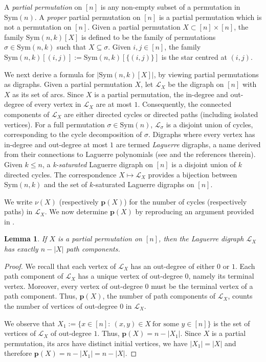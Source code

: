 \documentclass{amsart}
\newtheorem{lem}[thm]{Lemma}
\newcommand{\cy}{\nu}
\newcommand{\mcal}{\mathcal}
\newcommand{\sym}{\mathrm{Sym}}
\begin{document}
A {\it partial permutation} on $[n]$ is any non-empty subset of a permutation in $\sym(n)$. A {\it proper} partial permutation on $[n]$ is a partial permutation which is not a permutation on $[n]$. Given a partial permutation $X\subset [n]\times [n]$, the family $\sym(n,k)[X]$ is defined to be the family of permutations $\sigma \in \sym(n,k)$ such that $X\subseteq \sigma$. Given $i,j\in [n]$, the family $\sym(n,k)[(i,j)]:=\sym(n,k)[\{(i,j)\}]$ is the star centred at $(i,j)$.    

We next derive a formula for $|\sym(n,k)[X]|$, by viewing partial permutations as digraphs.
Given a partial permutation $X$, let $\mcal{L}_{X}$ be the digraph on $[n]$ with $X$ as its set of arcs. Since $X$ is a partial permutation, the in-degree and out-degree of every vertex in $\mcal{L}_{X}$ are at most $1$. Consequently, the connected components of $\mcal{L}_{X}$ are either
directed cycles or directed paths (including isolated vertices). For a full permutation $\sigma\in \sym(n)$, $\mcal{L}_{\sigma}$ is a disjoint union of cycles, corresponding to the cycle decomposition of $\sigma$. Digraphs where every vertex has in-degree and out-degree at most $1$ are termed {\it Laguerre} digraphs, a name derived from their connections to Laguerre polynomials (see \cite{MR782311,MR4392335} and the references therein). Given $k\leq n$, a {\it k-saturated} Laguerre digraph on $[n]$ is a disjoint union of $k$ directed cycles. The correspondence $X\mapsto\mcal{L}_{X}$ provides a bijection between $\sym(n,k)$ and the set of $k$-saturated Laguerre digraphs on $[n]$.

We write $\cy(X)$ (respectively $\mathbf{p}(X)$) for the number of cycles (respectively paths) in $\mcal{L}_{X}$. We now determine $\mathbf{p}(X)$ by reproducing an argument provided in \cite{MR782311}. 

\begin{lem}\label{lem:pathnumber}
If $X$ is a partial permutation on $[n]$, then the Laguerre digraph $\mcal{L}_{X}$ has exactly $n-|X|$ path components.
\end{lem}
\begin{proof}
We recall that each vertex of $\mcal{L}_{X}$ has an out-degree of either $0$ or $1$. Each path component of $\mcal{L}_{X}$ has a unique vertex of out-degree $0$, namely its terminal vertex. Moreover, every vertex of out-degree $0$ must be the terminal vertex of a path component. Thus, $\mathbf{p}(X)$, the number of path components of $\mcal{L}_{X}$, counts the number of vertices of out-degree $0$ in $\mcal{L}_{X}$.

We observe that $X_{1}:=\{x\in [n]\colon\ (x,y)\in X\ \text{for some $y\in [n]$}\}$ is the set of vertices of $\mcal{L}_{X}$ of out-degree $1$. Thus, $\mathbf{p}(X)=n-|X_{1}|$. Since $X$ is a partial permutation, its arcs have distinct initial vertices, we have $|X_{1}|=|X|$ and therefore $\mathbf{p}(X)=n-|X_{1}|=n-|X|$. 
\end{proof}
\end{document}
